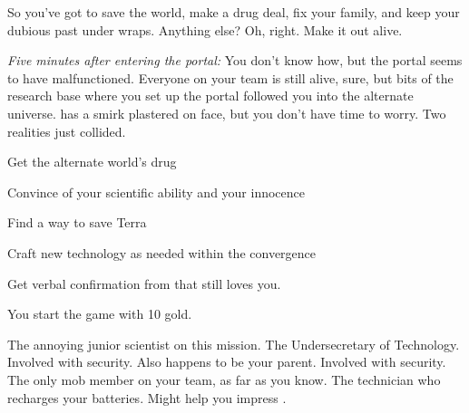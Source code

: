 \documentclass[char]{guildcamp3}
\begin{document}
So you've got to save the world, make a drug deal, fix your family, and keep your dubious past under wraps. Anything else? Oh, right. Make it out alive.

\emph{Five minutes after entering the portal:}
You don't know how, but the portal seems to have malfunctioned. Everyone on your team is still alive, sure, but bits of the research base where you set up the portal followed you into the alternate universe. \cSciOne{} has a smirk plastered on \cSciOne{\their} face, but you don't have time to worry. Two realities just collided.

\begin{itemz}[Goals]
  \item Get the alternate world's drug
  \item Convince \cSciTwo{} of your scientific ability and your innocence
  \item Find a way to save Terra
  \item Craft new technology as needed within the convergence
  \item Get verbal confirmation from \cSpecOpOne{} that \cSpecOpOne{\they} still loves you.
\end{itemz}

\begin{itemz}[Notes]
	\item You start the game with 10 gold. 
\end{itemz}

\begin{contacts}
  \contact{\cSciTwo{}} The annoying junior scientist on this mission.
  \contact{\cPoliTwo{}} The Undersecretary of Technology.
  \contact{\cSpecOpOne{}} Involved with security. Also happens to be your parent.
  \contact{\cSpecOpTwo{}} Involved with security. The only mob member on your team, as far as you know.
  \contact{\cTech{}} The technician who recharges your batteries. Might help you impress \cSciTwo{}.
\end{contacts}
\end{document}
